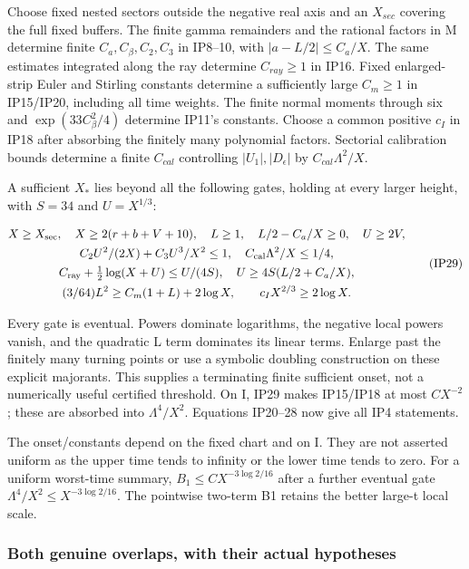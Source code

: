 Choose fixed nested sectors outside the negative real axis and an \(X_{sec}\) covering the full fixed buffers. The finite gamma remainders and the rational factors in M determine finite \(C_{a},C_{\beta},C_2,C_3\) in IP8--10, with \(|a-L/2|\le C_{a}/X\). The same estimates integrated along the ray determine \(C_{ray}\ge 1\) in IP16. Fixed enlarged-strip Euler and Stirling constants determine a sufficiently large \(C_{m}\ge 1\) in IP15/IP20, including all time weights. The finite normal moments through six and \(\exp(33 C_{\beta}^{2}/4)\) determine IP11's constants. Choose a common positive \(c_{I}\) in IP18 after absorbing the finitely many polynomial factors. Sectorial calibration bounds determine a finite \(C_{cal}\) controlling \(|U_{1}|,|D_{\epsilon}|\) by \(C_{cal} \Lambda^{2}/X\).

A sufficient \(X_*\) lies beyond all the following gates, holding at every larger height, with \(S=34\) and \(U=X^{1/3}:\)

\[
\begin{gathered}
X\ge X_{\rm sec},\quad X\ge2(r+b+V+10),\quad L\ge1,
\quad L/2-C_a/X\ge0,\quad U\ge2V,\\
C_2U^2/(2X)+C_3U^3/X^2\le1,\quad C_{\rm cal}\Lambda^2/X\le1/4,\\
C_{\rm ray}+\tfrac12\log(X+U)\le U/(4S),\quad
U\ge4S(L/2+C_a/X),\\
(3/64)L^2\ge C_m(1+L)+2\log X,\qquad
c_I X^{2/3}\ge2\log X.
\end{gathered}
\tag{IP29}\label{eq:ansatz-ip29}
\]

Every gate is eventual. Powers dominate logarithms, the negative local powers vanish, and the quadratic L term dominates its linear terms. Enlarge past the finitely many turning points or use a symbolic doubling construction on these explicit majorants. This supplies a terminating finite sufficient onset, not a numerically useful certified threshold. On I, IP29 makes IP15/IP18 at most \(C X^{-2}\); these are absorbed into \(\Lambda^{4}/X^{2}\). Equations IP20--28 now give all IP4 statements.

The onset/constants depend on the fixed chart and on I. They are not asserted uniform as the upper time tends to infinity or the lower time tends to zero. For a uniform worst-time summary, \(B_{1}\le C X^{-3 \log2/16}\) after a further eventual gate \(\Lambda^{4}/X^{2}\le X^{-3 \log2/16}\). The pointwise two-term B1 retains the better large-t local scale.

\subsubsection{Both genuine overlaps, with their actual hypotheses}
\label{subsec:ip-8}

